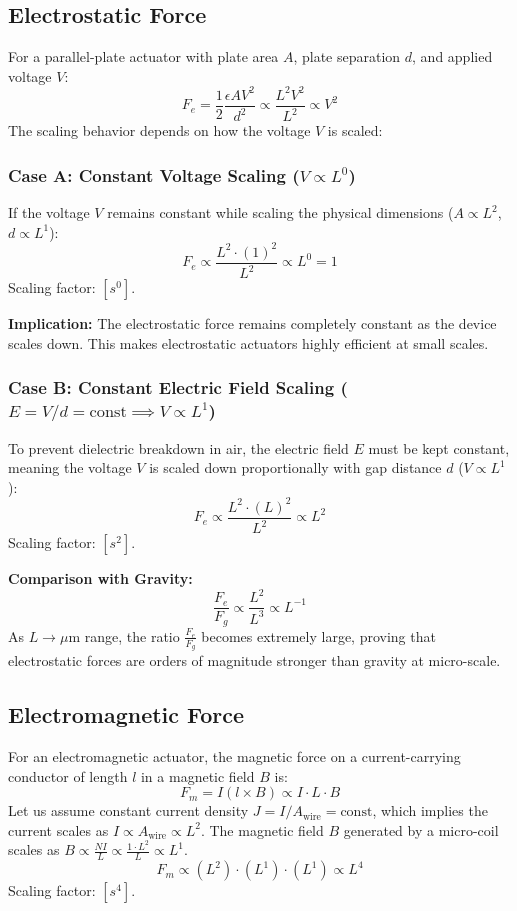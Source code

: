\documentclass[12pt,a4paper]{article}
\begin{document}
\subsection{Electrostatic Force}
For a parallel-plate actuator with plate area $A$, plate separation $d$, and applied voltage $V$:
$$F_e = \frac{1}{2} \frac{\epsilon A V^2}{d^2} \propto \frac{L^2 V^2}{L^2} \propto V^2$$
The scaling behavior depends on how the voltage $V$ is scaled:

\subsubsection{Case A: Constant Voltage Scaling \texorpdfstring{($V \propto L^0$)}{V propto L0}}
If the voltage $V$ remains constant while scaling the physical dimensions ($A \propto L^2$, $d \propto L^1$):
$$F_e \propto \frac{L^2 \cdot (1)^2}{L^2} \propto L^0 = 1$$
Scaling factor: $[s^0]$.

\textbf{Implication:} The electrostatic force remains completely constant as the device scales down. This makes electrostatic actuators highly efficient at small scales.

\subsubsection{Case B: Constant Electric Field Scaling \texorpdfstring{($E = V/d = \text{const} \implies V \propto L^1$)}{E = V/d = const => V propto L1}}
To prevent dielectric breakdown in air, the electric field $E$ must be kept constant, meaning the voltage $V$ is scaled down proportionally with gap distance $d$ ($V \propto L^1$):
$$F_e \propto \frac{L^2 \cdot (L)^2}{L^2} \propto L^2$$
Scaling factor: $[s^2]$.

\textbf{Comparison with Gravity:}
$$\frac{F_e}{F_g} \propto \frac{L^2}{L^3} \propto L^{-1}$$
As $L \to \mu\text{m}$ range, the ratio $\frac{F_e}{F_g}$ becomes extremely large, proving that electrostatic forces are orders of magnitude stronger than gravity at micro-scale.

\subsection{Electromagnetic Force}
For an electromagnetic actuator, the magnetic force on a current-carrying conductor of length $l$ in a magnetic field $B$ is:
$$F_m = I (l \times B) \propto I \cdot L \cdot B$$
Let us assume constant current density $J = I / A_{\text{wire}} = \text{const}$, which implies the current scales as $I \propto A_{\text{wire}} \propto L^2$.
The magnetic field $B$ generated by a micro-coil scales as $B \propto \frac{N I}{L} \propto \frac{1 \cdot L^2}{L} \propto L^1$.
$$F_m \propto (L^2) \cdot (L^1) \cdot (L^1) \propto L^4$$
Scaling factor: $[s^4]$.
\end{document}
